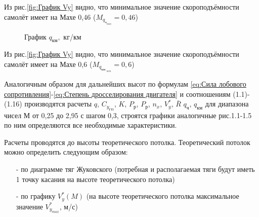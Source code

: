 Из рис.\ref{fig:График Vy} видно, что минимальное значение скороподъёмности самолёт имеет на Махе 0,46 ($M_{q_{\text{ч}_{min}}} = 0,46$)

\begin{figure}[H]
    \caption{График $q_\text{км}, $ кг/км}
    \label{fig:График qkm}
\end{figure}

Из рис.\ref{fig:График Vy} видно, что минимальное значение скороподъёмности самолёт имеет на Махе 0,6 ($M_{q_{\text{км }_{min}}} = 0,6$)

Аналогичным образом для дальнейших высот по формулам \ref{eq:Сила лобового сопротивления}-\ref{eq:Степень дросселирования двигателя} и
соотношениям (1.1)-(1.16) производятся расчеты $q$, $C_{y_\text{ГП}}$, $K$, $P_\text{р}$, $P_\text{р}$, $n_x$, $V_y^*$, $\bar{R}$ $q_\text{ч}$, $q_\text{км}$ для диапазона чисел М от 0,25 до 2,95 с шагом 0,3, строятся графики аналогичные рис.1.1-1.5 по ним определяются все
необходимые характеристики. 

Расчеты проводятся до высоты теоретического потолка. Теоретический
потолок можно определить следующим образом: 

\begin{enumerate}
\item [-] по диаграмме тяг Жуковского (потребная и располагаемая тяги будут иметь 1
точку касания на высоте теоретического потолка) 
    \item [-] по графику $V_y^*(M)$ (на высоте теоретического потолка максимальное значение $V^*_{y_{max}}$, м/с) 
 \end{enumerate}
 
